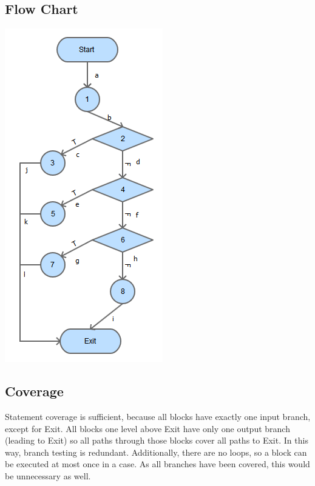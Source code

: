 \documentclass{article}
\begin{document}
\subsection{Flow Chart}
\centerline{\includegraphics[scale=1.1]{../images/Whitebox_Testing_Diagram}}

\subsection{Coverage}
Statement coverage is sufficient, because all blocks have exactly one input branch, except for Exit.  All blocks one level above Exit have only one output branch (leading to Exit) so all paths through those blocks cover all paths to Exit.  In this way, branch testing is redundant.  Additionally, there are no loops, so a block can be executed at most once in a case.  As all branches have been covered, this would be unnecessary as well.
\end{document}
